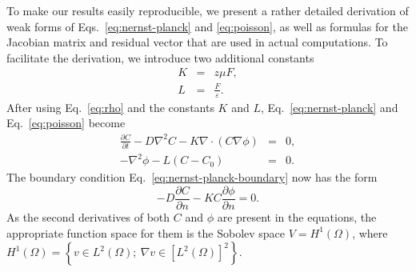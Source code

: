 To make our results easily reproducible, we present a rather detailed
derivation of weak forms of Eqs.~\eqref{eq:nernst-planck} and 
\eqref{eq:poisson}, as well as formulas for the Jacobian matrix and residual 
vector that are used in actual computations.
To facilitate the derivation, we introduce two additional constants 
\begin{eqnarray}
  K & = &z \mu F,\\
  L&=&\frac{F}{\varepsilon}.
  \label{eq:KL}
\end{eqnarray}
After using Eq.~\eqref{eq:rho} and the constants $K$ and $L$, 
Eq.~\eqref{eq:nernst-planck} and Eq.~\eqref{eq:poisson} become
\begin{eqnarray}
  \frac{\partial C}{\partial t}-D\nabla^2 C-K\nabla\cdot \left(C\nabla\phi\right)&=&0,\label{eq:nernst-planck-2}\\
  -\nabla^2\phi-L\left(C-C_{0}\right)&=&0.\label{eq:poisson-2}
\end{eqnarray}
The boundary condition Eq.~\eqref{eq:nernst-planck-boundary} now has the form
\begin{equation}
  -D\frac{\partial C}{\partial n}-KC\frac{\partial\phi}{\partial n}=0.
  \label{eq:nernst-planck-boundary-2}
\end{equation}
As the second derivatives of both $C$ and $\phi$ are present in the 
equations, the appropriate function space for them is the Sobolev space 
$V=H^1\left(\Omega\right)$, where 
$H^1\left(\Omega\right)=\left\{v\in L^2\left(\Omega\right);\ \nabla v \in \left[L^2\left(\Omega\right)\right]^2\right\}$.

